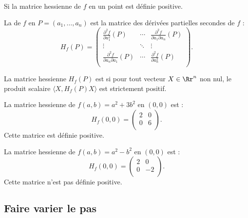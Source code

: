 \begin{theoreme}{}{}
	Si la matrice hessienne de $f$ en un point  est définie positive.
\end{theoreme}

\begin{definition}
	La  de $f$ en $P = (a_1,\ldots,a_n)$ est la matrice des dérivées partielles secondes de $f$ :
	$$H_f(P) = \begin{pmatrix}
	\frac{\partial^2 f}{\partial a_1^2}(P) & \cdots & \frac{\partial^2 f}{\partial a_1 \partial a_n}(P) \\
	\vdots & \ddots & \vdots \\
	\frac{\partial^2 f}{\partial a_n \partial a_1}(P) & \cdots & \frac{\partial^2 f}{\partial a_n^2}(P) \\
	\end{pmatrix}.$$
\end{definition}

\begin{definition}
	La matrice hessienne $H_f(P)$ est  si pour tout vecteur $X \in \Rr^n$ non nul, le produit scalaire $\langle X,H_f(P)X \rangle$ est strictement positif.
\end{definition}

\begin{exemple}
	La matrice hessienne de $f(a,b) = a^2 + 3b^2$ en $(0,0)$ est :
	$$H_f(0,0) = \begin{pmatrix}
	2 & 0 \\
	0 & 6 \\
	\end{pmatrix}.$$
	Cette matrice est définie positive.
\end{exemple}

\begin{exemple}
	La matrice hessienne de $f(a,b) = a^2 - b^2$ en $(0,0)$ est :
	$$H_f(0,0) = \begin{pmatrix}
	2 & 0 \\
	0 & -2 \\
	\end{pmatrix}.$$
	Cette matrice n'est pas définie positive.
\end{exemple}



\subsection{Faire varier le pas}

